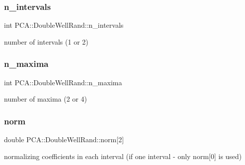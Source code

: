 \subsubsection{\texorpdfstring{n\+\_\+intervals}{n\_intervals}}
{\footnotesize\ttfamily int P\+C\+A\+::\+Double\+Well\+Rand\+::n\+\_\+intervals\hspace{0.3cm}{\ttfamily [private]}}



number of intervals (1 or 2) 

\hypertarget{class_p_c_a_1_1_double_well_rand_ae53977982288d0b187a7fab536bbc55b}{}\label{class_p_c_a_1_1_double_well_rand_ae53977982288d0b187a7fab536bbc55b} 
\subsubsection{\texorpdfstring{n\+\_\+maxima}{n\_maxima}}
{\footnotesize\ttfamily int P\+C\+A\+::\+Double\+Well\+Rand\+::n\+\_\+maxima\hspace{0.3cm}{\ttfamily [private]}}



number of maxima (2 or 4) 

\hypertarget{class_p_c_a_1_1_double_well_rand_aa31900946aeacdd5f462704393b93413}{}\label{class_p_c_a_1_1_double_well_rand_aa31900946aeacdd5f462704393b93413} 
\subsubsection{\texorpdfstring{norm}{norm}}
{\footnotesize\ttfamily double P\+C\+A\+::\+Double\+Well\+Rand\+::norm\mbox{[}2\mbox{]}\hspace{0.3cm}{\ttfamily [private]}}



normalizing coefficients in each interval (if one interval -\/ only norm\mbox{[}0\mbox{]} is used) 

\hypertarget{class_p_c_a_1_1_double_well_rand_abad044e066c9b93b3eacb6d36440f650}{}\label{class_p_c_a_1_1_double_well_rand_abad044e066c9b93b3eacb6d36440f650} 
